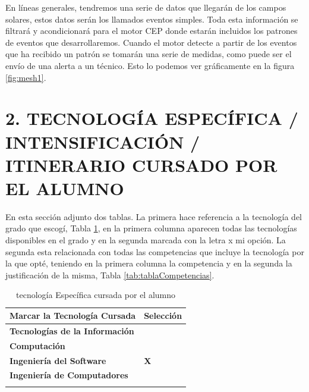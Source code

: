 \documentclass[a4paper]{article}
\begin{document}
En líneas generales, tendremos una serie de datos que llegarán de los campos solares, estos datos serán los llamados eventos simples. Toda esta información se filtrará y acondicionará para el motor CEP donde estarán incluidos los patrones de eventos que desarrollaremos. Cuando el motor detecte a partir de los eventos que ha recibido un patrón se tomarán una serie de medidas, como puede ser el envío de una alerta a un técnico. Esto lo podemos ver gráficamente en la figura \ref{fig:mesh1}.

\section{2. TECNOLOG\'IA ESPEC\'IFICA / INTENSIFICACIÓN / ITINERARIO CURSADO POR EL ALUMNO}

\bigskip
En esta sección adjunto dos tablas. La primera hace referencia a la tecnología del grado que escogí, Tabla \ref{tab:tablaTecnologia}, en la primera columna aparecen todas las tecnologías disponibles en el grado y en la segunda marcada con la letra x mi opción. La segunda esta relacionada con todas las competencias que incluye la tecnología por la que opté, teniendo en la primera columna la competencia y en la segunda la justificación de la misma, Tabla \ref{tab:tablaCompetencias}.

\clearpage\pagestyle{plain}

\begin{longtable}{m{6.803cm} m{2.605cm}}

    \rowcolor{gray!50}
	{\color{black} \textbf{Marcar la Tecnolog\'ia Cursada}} &
	{\color{black} \textbf{Selección}}\\\hline
	
    {\color{black} \textbf{Tecnolog\'ias de la Informaci\'on}} &
    {\color{black} \textbf{}}\\\hline
	\rowcolor{gray!30}
    {\color{black} \textbf{Computaci\'on}}&
    {\color{black} \textbf{}}\\\hline
	
    {\color{black} \textbf{Ingenier\'ia del Software}}&
    {\color{black} \textbf{X}}\\\hline
	\rowcolor{gray!30}

	{\color{black} \textbf{Ingenier\'ia de Computadores}}&
    {\color{black} \textbf{}}\\\hline
\caption{tecnolog\'ia Espec\'ifica cursada por el alumno}\label{tab:tablaTecnologia}
\end{longtable}
\end{document}
